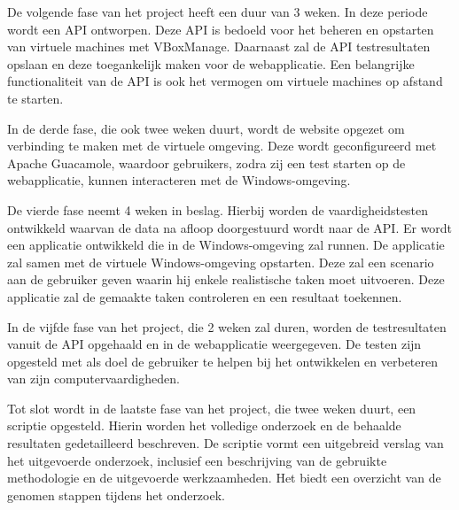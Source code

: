 De volgende fase van het project heeft een duur van 3 weken. In deze periode wordt een API ontworpen. Deze API is bedoeld voor het beheren en opstarten van virtuele machines met VBoxManage. Daarnaast zal de API testresultaten opslaan en deze toegankelijk maken voor de webapplicatie. Een belangrijke functionaliteit van de API is ook het vermogen om virtuele machines op afstand te starten.

In de derde fase, die ook twee weken duurt, wordt de website opgezet om verbinding te maken met de virtuele omgeving. Deze wordt geconfigureerd met Apache Guacamole, waardoor gebruikers, zodra zij een test starten op de webapplicatie, kunnen interacteren met de Windows-omgeving.

De vierde fase neemt 4 weken in beslag. Hierbij worden de vaardigheidstesten ontwikkeld waarvan de data na afloop doorgestuurd wordt naar de API. Er wordt een applicatie ontwikkeld die in de Windows-omgeving zal runnen. De applicatie zal samen met de virtuele Windows-omgeving opstarten. Deze zal een scenario aan de gebruiker geven waarin hij enkele realistische taken moet uitvoeren. Deze applicatie zal de gemaakte taken controleren en een resultaat toekennen.

In de vijfde fase van het project, die 2 weken zal duren, worden de testresultaten vanuit de API opgehaald en in de webapplicatie weergegeven. De testen zijn opgesteld met als doel de gebruiker te helpen bij het ontwikkelen en verbeteren van zijn computervaardigheden.

Tot slot wordt in de laatste fase van het project, die twee weken duurt, een scriptie opgesteld. Hierin worden het volledige onderzoek en de behaalde resultaten gedetailleerd beschreven. De scriptie vormt een uitgebreid verslag van het uitgevoerde onderzoek, inclusief een beschrijving van de gebruikte methodologie en de uitgevoerde werkzaamheden. Het biedt een overzicht van de genomen stappen tijdens het onderzoek.


